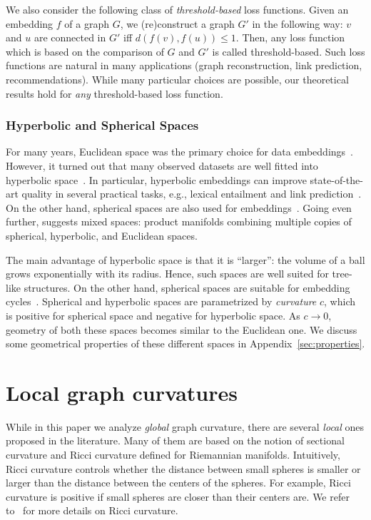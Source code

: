 \documentclass[runningheads]{llncs}
\begin{document}
We also consider the following class of \textit{threshold-based} loss functions. Given an embedding $f$ of a graph $G$, we (re)construct a graph $G'$ in the following way: $v$ and $u$ are connected in $G'$ iff $d(f(v),f(u))\le 1$. Then, any loss function which is based on the comparison of $G$ and $G'$ is called threshold-based. 
Such loss functions are natural in many applications (graph reconstruction, link prediction, recommendations).
While many particular choices are possible, our theoretical results hold for \textit{any} threshold-based loss function.


\subsubsection{Hyperbolic and Spherical Spaces}

For many years, Euclidean space was the primary choice for data embeddings~\cite{goyal2018graph}. However, it turned out that many observed datasets are well fitted into hyperbolic space~\cite{krioukov2010hyperbolic}. In particular, hyperbolic embeddings can improve state-of-the-art quality in several practical tasks, e.g., lexical entailment and link prediction~\cite{nickel2017poincare}. On the other hand, spherical spaces are also used for embeddings~\cite{liu2017sphereface}. Going even further, \cite{gu2019learning} suggests mixed spaces: product manifolds combining multiple copies of spherical, hyperbolic, and Euclidean spaces. 

The main advantage of hyperbolic space is that it is ``larger'': the volume of a ball grows exponentially with its radius. Hence, such spaces are well suited for tree-like structures. On the other hand, spherical spaces are suitable for embedding cycles~\cite{gu2019learning}. Spherical and hyperbolic spaces are parametrized by \textit{curvature} $c$, which is positive for spherical space and negative for hyperbolic space. As $c \to 0$, geometry of both these spaces becomes similar to the Euclidean one. We discuss some geometrical properties of these different spaces in Appendix~\ref{sec:properties}.


\section{Local graph curvatures}

While in this paper we analyze \textit{global} graph curvature, there are several \textit{local} ones proposed in the literature. Many of them are based on the notion of sectional curvature and Ricci curvature defined for Riemannian manifolds. Intuitively, Ricci curvature controls whether the distance between small spheres is smaller or larger than the distance between the centers of the spheres. For example, Ricci curvature is positive if small spheres are closer than their centers are. We refer to~\cite{jost2009geometry,oneill1983semiriemannian} for more details on Ricci curvature.
\end{document}
